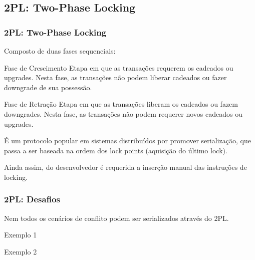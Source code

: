 \documentclass{beamer}
\begin{document}
\subsection{2PL: Two-Phase Locking}
\begin{frame}
    \frametitle{2PL: Two-Phase Locking}

    Composto de duas fases sequenciais:

    \begin{block}{Fase de Crescimento}
        Etapa em que as transações requerem os cadeados ou upgrades. Nesta fase, as transações não podem liberar cadeados ou fazer downgrade de sua possessão.
    \end{block}

    \begin{block}{Fase de Retração}
        Etapa em que as transações liberam os cadeados ou fazem downgrades. Nesta fase, as transações não podem requerer novos cadeados ou upgrades.
    \end{block}

    É um protocolo popular em sistemas distribuídos por promover serialização, que passa a ser baseada na ordem dos lock points (aquisição do último lock).

    Ainda assim, do desenvolvedor é requerida a inserção manual das instruções de locking.
\end{frame}


\begin{frame}
\frametitle{2PL: Desafios}

Nem todos os cenários de conflito podem ser serializados através do 2PL. 

\begin{block}{Exemplo 1}
\end{block}

\begin{block}{Exemplo 2}
\end{block}

\end{frame}

\end{document}
